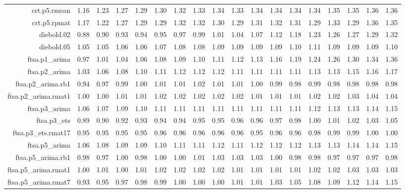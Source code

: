 \begin{tabular}{rrrrrrrrrrrrrrrrrr}
  crt.p5.rmean & 1.16 & 1.23 & 1.27 & 1.29 & 1.30 & 1.32 & 1.33 & 1.34 & 1.33 & 1.34 & 1.34 & 1.34 & 1.34 & 1.35 & 1.35 & 1.36 & 1.36 \\ 
  crt.p5.rpmat & 1.17 & 1.22 & 1.27 & 1.29 & 1.29 & 1.32 & 1.32 & 1.30 & 1.29 & 1.31 & 1.32 & 1.31 & 1.29 & 1.33 & 1.29 & 1.36 & 1.35 \\ 
  diebold.02 & 0.88 & 0.90 & 0.93 & 0.94 & 0.95 & 0.97 & 0.99 & 1.01 & 1.04 & 1.07 & 1.12 & 1.18 & 1.23 & 1.26 & 1.27 & 1.29 & 1.32 \\ 
  diebold.05 & 1.05 & 1.05 & 1.06 & 1.06 & 1.07 & 1.08 & 1.08 & 1.09 & 1.09 & 1.09 & 1.09 & 1.10 & 1.11 & 1.09 & 1.09 & 1.09 & 1.10 \\ 
  ftsa.p1\_arima & 0.97 & 1.01 & 1.04 & 1.06 & 1.08 & 1.09 & 1.10 & 1.11 & 1.12 & 1.13 & 1.16 & 1.19 & 1.24 & 1.26 & 1.30 & 1.34 & 1.36 \\ 
  ftsa.p2\_arima & 1.03 & 1.06 & 1.08 & 1.10 & 1.11 & 1.12 & 1.12 & 1.12 & 1.11 & 1.11 & 1.11 & 1.11 & 1.13 & 1.13 & 1.15 & 1.16 & 1.17 \\ 
  ftsa.p2\_arima.rb1 & 0.94 & 0.97 & 0.99 & 1.00 & 1.01 & 1.01 & 1.02 & 1.01 & 1.01 & 1.00 & 0.99 & 0.98 & 0.99 & 0.98 & 0.98 & 0.98 & 0.98 \\ 
  ftsa.p2\_arima.rmat1 & 1.00 & 1.00 & 1.01 & 1.01 & 1.02 & 1.02 & 1.02 & 1.02 & 1.02 & 1.01 & 1.01 & 1.01 & 1.02 & 1.02 & 1.03 & 1.04 & 1.04 \\ 
  ftsa.p3\_arima & 1.06 & 1.07 & 1.09 & 1.10 & 1.11 & 1.11 & 1.11 & 1.11 & 1.11 & 1.11 & 1.11 & 1.11 & 1.12 & 1.13 & 1.13 & 1.14 & 1.15 \\ 
  ftsa.p3\_ets & 0.89 & 0.90 & 0.92 & 0.93 & 0.94 & 0.94 & 0.95 & 0.95 & 0.96 & 0.96 & 0.97 & 0.98 & 1.00 & 1.01 & 1.02 & 1.03 & 1.05 \\ 
  ftsa.p3\_ets.rmat17 & 0.95 & 0.95 & 0.95 & 0.95 & 0.96 & 0.96 & 0.96 & 0.96 & 0.96 & 0.95 & 0.96 & 0.96 & 0.98 & 0.99 & 0.99 & 1.00 & 1.00 \\ 
  ftsa.p5\_arima & 1.06 & 1.08 & 1.09 & 1.09 & 1.10 & 1.11 & 1.11 & 1.12 & 1.11 & 1.12 & 1.12 & 1.12 & 1.13 & 1.13 & 1.14 & 1.14 & 1.15 \\ 
  ftsa.p5\_arima.rb1 & 0.98 & 0.97 & 1.00 & 0.98 & 1.00 & 1.00 & 1.01 & 1.03 & 1.03 & 1.03 & 1.00 & 0.98 & 0.98 & 0.97 & 0.97 & 0.97 & 0.98 \\ 
  ftsa.p5\_arima.rmat1 & 1.00 & 1.01 & 1.00 & 1.01 & 1.02 & 1.02 & 1.02 & 1.02 & 1.01 & 1.01 & 1.01 & 1.01 & 1.02 & 1.02 & 1.03 & 1.03 & 1.03 \\ 
  ftsa.p5\_arima.rmat7 & 0.93 & 0.95 & 0.97 & 0.98 & 0.99 & 1.00 & 1.00 & 1.00 & 1.01 & 1.01 & 1.03 & 1.05 & 1.08 & 1.09 & 1.12 & 1.14 & 1.15 \\ 

\end{tabular}
